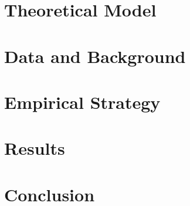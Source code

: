 \documentclass[12pt]{article}
\begin{document}
%

\section{Theoretical Model} \label{model}


\section{Data and Background} \label{data}


\section{Empirical Strategy} \label{empirical_strategy}


\section{Results} \label{results}


\section{Conclusion} \label{conclusion}



\clearpage

\singlespacing





\newpage 

\end{document}
